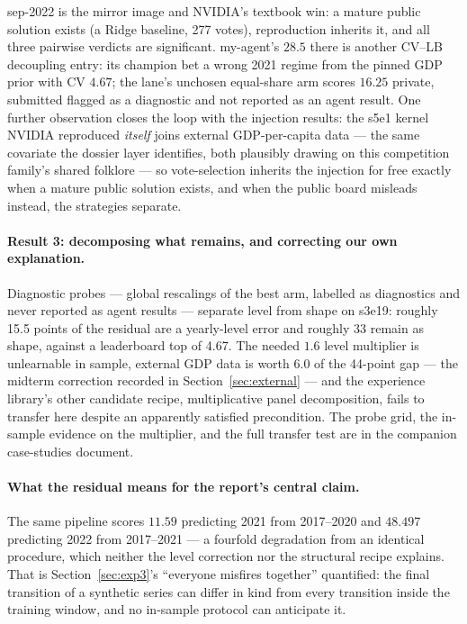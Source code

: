 \documentclass[11pt,a4paper]{article}
\begin{document}
sep-2022 is the mirror image and NVIDIA's textbook win: a mature public solution exists (a
Ridge baseline, 277 votes), reproduction inherits it, and all three pairwise verdicts are
significant. my-agent's $28.5$ there is another CV--LB decoupling entry: its champion bet a
wrong 2021 regime from the pinned GDP prior with CV $4.67$; the lane's unchosen equal-share
arm scores $16.25$ private, submitted flagged as a diagnostic and not reported as an agent
result. One further observation closes the loop with the injection results: the s5e1 kernel
NVIDIA reproduced \emph{itself} joins external GDP-per-capita data --- the same covariate the
dossier layer identifies, both plausibly drawing on this competition family's shared folklore
--- so vote-selection
inherits the injection for free exactly when a mature public solution exists, and when the
public board misleads instead, the strategies separate.

\paragraph{Result 3: decomposing what remains, and correcting our own explanation.} Diagnostic probes --- global rescalings of the best arm, labelled as diagnostics and never reported as agent results --- separate level from shape on s3e19: roughly 15.5 points of the residual are a yearly-level error and roughly 33 remain as shape, against a leaderboard top of 4.67. The needed $1.6$ level multiplier is unlearnable in sample, external GDP data is worth $6.0$ of the 44-point gap --- the midterm correction recorded in Section~\ref{sec:external} --- and the experience library's other candidate recipe, multiplicative panel decomposition, fails to transfer here despite an apparently satisfied precondition. The probe grid, the in-sample evidence on the multiplier, and the full transfer test are in the companion case-studies document.

\paragraph{What the residual means for the report's central claim.} The same pipeline scores $11.59$ predicting 2021 from 2017--2020 and $48.497$ predicting 2022 from 2017--2021 --- a fourfold degradation from an identical procedure, which neither the level correction nor the structural recipe explains. That is Section~\ref{sec:exp3}'s ``everyone misfires together'' quantified: the final transition of a synthetic series can differ in kind from every transition inside the training window, and no in-sample protocol can anticipate it.
\end{document}
